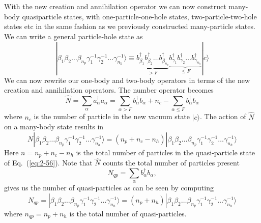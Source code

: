 \documentclass[graybox,sectrefs,envcountresetchap,open=right]{svmonodo}
\begin{document}
With the new creation and annihilation operator  we can now construct 
many-body quasiparticle states, with one-particle-one-hole states, two-particle-two-hole
states etc in the same fashion as we previously constructed many-particle states. 
We can write a general particle-hole state as
\begin{equation}
	|\beta_1\beta_2\dots \beta_{n_p} \gamma_1^{-1} \gamma_2^{-1} \dots \gamma_{n_h}^{-1}\rangle \equiv
		\underbrace{b_{\beta_1}^\dagger b_{\beta_2}^\dagger \dots b_{\beta_{n_p}}^\dagger}_{>F}
		\underbrace{b_{\gamma_1}^\dagger b_{\gamma_2}^\dagger \dots b_{\gamma_{n_h}}^\dagger}_{\leq F} |c\rangle \label{eq:2-56}
\end{equation}
We can now rewrite our one-body and two-body operators in terms of the new creation and annihilation operators.
The number operator becomes
\begin{equation}
	\hat{N} = \sum_\alpha a_\alpha^\dagger a_\alpha= 
\sum_{\alpha > F} b_\alpha^\dagger b_\alpha + n_c - \sum_{\alpha \leq F} b_\alpha^\dagger b_\alpha \label{eq:2-57b}
\end{equation}
where $n_c$ is the number of particle in the new vacuum state $|c\rangle $.  
The action of $\hat{N}$ on a many-body state results in 
\begin{equation}
	N |\beta_1\beta_2\dots \beta_{n_p} \gamma_1^{-1} \gamma_2^{-1} \dots \gamma_{n_h}^{-1}\rangle = (n_p + n_c - n_h) |\beta_1\beta_2\dots \beta_{n_p} \gamma_1^{-1} \gamma_2^{-1} \dots \gamma_{n_h}^{-1}\rangle \label{2-59}
\end{equation}
Here  $n=n_p +n_c - n_h$ is the total number of particles in the quasi-particle state of 
Eq.~(\ref{eq:2-56}). Note that  $\hat{N}$ counts the total number of particles  present 
\begin{equation}
	N_{qp} = \sum_\alpha b_\alpha^\dagger b_\alpha, \label{eq:2-60}
\end{equation}
gives us the number of quasi-particles as can be seen by computing
\begin{equation}
	N_{qp}= |\beta_1\beta_2\dots \beta_{n_p} \gamma_1^{-1} \gamma_2^{-1} \dots \gamma_{n_h}^{-1}\rangle
		= (n_p + n_h)|\beta_1\beta_2\dots \beta_{n_p} \gamma_1^{-1} \gamma_2^{-1} \dots \gamma_{n_h}^{-1}\rangle \label{eq:2-61}
\end{equation}
where $n_{qp} = n_p + n_h$ is the total number of quasi-particles.
\end{document}
